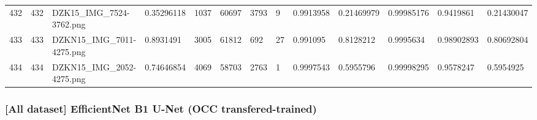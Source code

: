 \documentclass[11pt, a4paper, twoside]{report}
\begin{document}
\begin{longtable}[c]{@{}lllllllllllll@{}}
432 & 432 & DZK15\_IMG\_7524-3762.png & 0.35296118 & 1037 & 60697 & 3793 & 9 & 0.9913958 & 0.21469979 & 0.99985176 & 0.9419861 & 0.21430047 \\
433 & 433 & DZKN15\_IMG\_7011-4275.png & 0.8931491 & 3005 & 61812 & 692 & 27 & 0.991095 & 0.8128212 & 0.9995634 & 0.98902893 & 0.80692804 \\
434 & 434 & DZKN15\_IMG\_2052-4275.png & 0.74646854 & 4069 & 58703 & 2763 & 1 & 0.9997543 & 0.5955796 & 0.99998295 & 0.9578247 & 0.5954925 \\* \bottomrule
\end{longtable}

\newpage

\subsubsection{[All dataset] EfficientNet B1 U-Net (OCC transfered-trained)}
\end{document}
